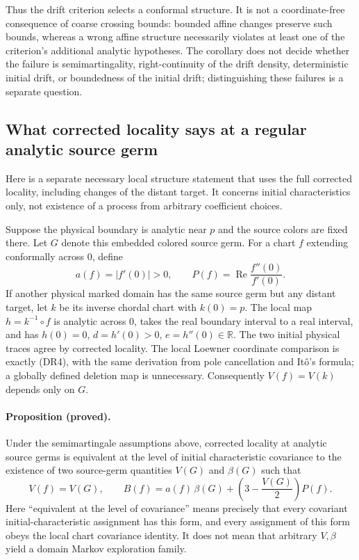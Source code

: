 \documentclass[11pt]{article}
\theoremstyle{definition}\newtheorem{definition}[theorem]{Definition}
\theoremstyle{remark}\newtheorem{remark}[theorem]{Remark}
\begin{document}
Thus the drift criterion selects a conformal structure.  It is not a
coordinate-free consequence of coarse crossing bounds: bounded affine
changes preserve such bounds, whereas a wrong affine structure necessarily
violates at least one of the criterion's additional analytic hypotheses.
The corollary does not decide whether the failure is semimartingality,
right-continuity of the drift density, deterministic initial drift,
or boundedness of the initial drift; distinguishing these failures is a
separate question.

\subsection{What corrected locality says at a regular analytic source germ}

Here is a separate necessary local structure statement that uses the full
corrected locality, including changes of the distant target.  It concerns
initial characteristics only, not existence of a process from arbitrary
coefficient choices.

Suppose the physical boundary is analytic near $p$ and the source colors
are fixed there.  Let $G$ denote this embedded colored source germ.  For a
chart $f$ extending conformally across $0$, define
\[
 a(f)=|f'(0)|>0,\qquad
 P(f)=\operatorname{Re}\frac{f''(0)}{f'(0)}.
 \tag{DR16}
\]
If another physical marked domain has the same source germ but any distant
target, let $k$ be its inverse chordal chart with $k(0)=p$.  The local map
$h=k^{-1}\circ f$ is analytic across $0$, takes the real boundary interval
to a real interval, and has $h(0)=0$, $d=h'(0)>0$, $e=h''(0)\in\mathbb R$.
The two initial physical traces agree by corrected locality.  The local
Loewner coordinate comparison is exactly (DR4), with the same derivation
from pole cancellation and It\^o's formula; a globally defined deletion map
is unnecessary.  Consequently $V(f)=V(k)$ depends only on $G$.

\paragraph{Proposition (proved).}
Under the semimartingale assumptions above, corrected locality at analytic
source germs is equivalent at the level of initial characteristic covariance
to the existence of two source-germ quantities $V(G)$ and $\beta(G)$ such that
\[
 \boxed{\quad
 V(f)=V(G),\qquad
 B(f)=a(f)\,\beta(G)
                 +\left(3-\frac{V(G)}2\right)P(f).
 \quad}
 \tag{DR17}
\]
Here ``equivalent at the level of covariance'' means precisely that every
covariant initial-characteristic assignment has this form, and every
assignment of this form obeys the local chart covariance identity.  It does
not mean that arbitrary $V,\beta$ yield a domain Markov exploration family.
\end{document}
